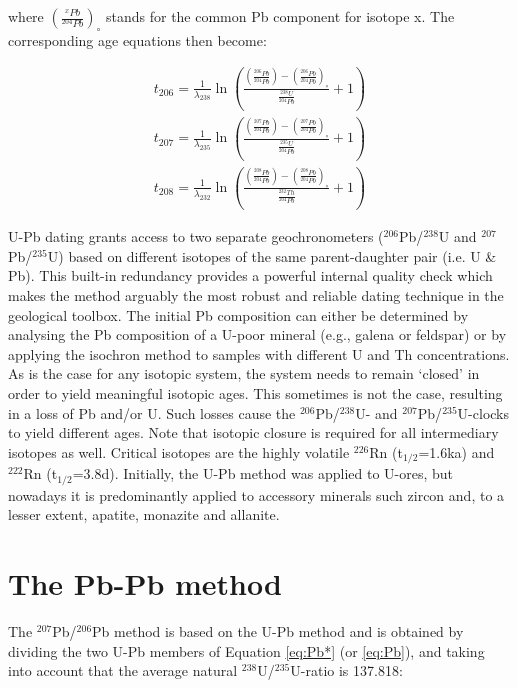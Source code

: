 where $\left(\frac{^{x}Pb}{^{204}Pb}\right)_\circ$ stands for the
common Pb component for isotope x. The corresponding age equations
then become:

\begin{equation}
\begin{array}{c}
  t_{206}=\frac{1}{\lambda_{238}}\ln\left(\frac{\left(\frac{^{206}Pb}{^{204}Pb}\right)-
    \left(\frac{^{206}Pb}{^{204}Pb}\right)_\circ}{\frac{^{238}U}{^{204}Pb}}+1\right)\\
  t_{207}=\frac{1}{\lambda_{235}}\ln\left(\frac{\left(\frac{^{207}Pb}{^{204}Pb}\right)-
    \left(\frac{^{207}Pb}{^{204}Pb}\right)_\circ}{\frac{^{235}U}{^{204}Pb}}+1\right)\\
  t_{208}=\frac{1}{\lambda_{232}}\ln\left(\frac{\left(\frac{^{208}Pb}{^{204}Pb}\right)-
    \left(\frac{^{208}Pb}{^{204}Pb}\right)_\circ}{\frac{^{232}Th}{^{204}Pb}}+1\right)
\end{array}
\label{eq:tPb}
\end{equation}

U-Pb dating grants access to two separate geochronometers
($^{206}$Pb/${}^{238}$U and $^{207}$Pb/${}^{235}$U) based on different
isotopes of the same parent-daughter pair (i.e. U \& Pb).  This
built-in redundancy provides a powerful internal quality check which
makes the method arguably the most robust and reliable dating
technique in the geological toolbox. The initial Pb composition can
either be determined by analysing the Pb composition of a U-poor
mineral (e.g., galena or feldspar) or by applying the isochron method
to samples with different U and Th concentrations. As is the case for
any isotopic system, the system needs to remain `closed' in order to
yield meaningful isotopic ages.  This sometimes is not the case,
resulting in a loss of Pb and/or U.  Such losses cause the
$^{206}$Pb/$^{238}$U- and $^{207}$Pb/$^{235}$U-clocks to yield
different ages. Note that isotopic closure is required for all
intermediary isotopes as well.  Critical isotopes are the highly
volatile $^{226}$Rn (t$_{1/2}$=1.6ka) and $^{222}$Rn
(t$_{1/2}$=3.8d). Initially, the U-Pb method was applied to U-ores,
but nowadays it is predominantly applied to accessory minerals such
zircon and, to a lesser extent, apatite, monazite and allanite.

\section{The Pb-Pb method}
\label{sec:Pb-Pb}

The $^{207}$Pb/$^{206}$Pb method is based on the U-Pb method and is
obtained by dividing the two U-Pb members of Equation \ref{eq:Pb*} (or
\ref{eq:Pb}), and taking into account that the average natural
$^{238}$U/$^{235}$U-ratio is 137.818:

